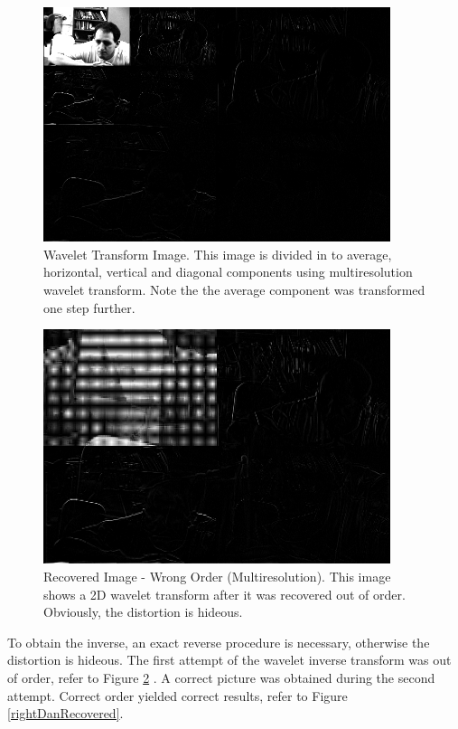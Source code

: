 \begin{figure}[htb]
\begin{center}
\includegraphics [width=4in]{wavepic3R.jpg}
\end{center}
\caption{Wavelet Transform Image.  This image is divided in to average, horizontal, vertical and diagonal components using multiresolution wavelet transform.  Note the the average component was transformed one step further. }
\label{wavepicR3}
\end{figure}

\begin{figure}[htb]
\begin{center}
\includegraphics [width=4in]{recoverHid.jpg}
\end{center}
\caption{Recovered Image - Wrong Order (Multiresolution). This image shows a 2D wavelet transform after it was recovered out of order.  Obviously, the distortion is hideous.  }
\label{recoverHid}
\end{figure}

To obtain the inverse, an exact reverse procedure is necessary, otherwise the distortion is hideous.   The first attempt of the wavelet inverse transform was out of order, refer to Figure \ref{recoverHid} .  A correct picture was obtained during the second attempt.  Correct order yielded correct results, refer to Figure \ref{rightDanRecovered}.

